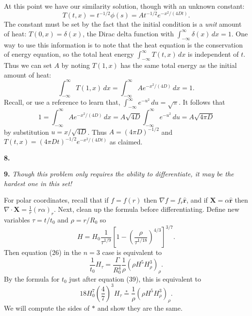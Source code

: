 \documentclass[10pt]{amsart}
\newcommand{\mfile}[1]{
\begin{quote}
\bigskip
\VerbatimInput[frame=single,label=\fbox{\normalsize \textsl{\,#1\,}},fontfamily=courier,fontsize=\footnotesize]{#1}
\end{quote}
}
\newcommand{\Div}{\nabla\cdot}
\newcommand{\grad}{\nabla}
\newcommand{\prob}[1]{\bigskip\noindent\large\textbf{#1.}\normalsize }
\begin{document}
At this point we have our similarity solution, though with an unknown constant:
    $$T(t,x) = t^{-1/2} \phi(s) = A t^{-1/2} e^{- x^2/(4Dt)}.$$
The constant must be set by the fact that the initial condition is a \emph{unit} amount of heat: $T(0,x) = \delta(x)$, the Dirac delta function with $\int_{-\infty}^\infty \delta(x)\,dx = 1$.  One way to use this information is to note that the heat equation is the conservation of energy equation, so the total heat energy $\int_{-\infty}^\infty T(t,x)\,dx$ is independent of $t$.  Thus we can set $A$ by noting $T(1,x)$ has the same total energy as the initial amount of heat:
    $$\int_{-\infty}^\infty T(1,x)\,dx = \int_{-\infty}^\infty A e^{- x^2/(4D)}\,dx = 1.$$
Recall, or use a reference to learn that, $\int_{-\infty}^\infty e^{- u^2}\,du = \sqrt{\pi}$.  It follows that
    $$1 = \int_{-\infty}^\infty A e^{- x^2/(4D)}\,dx = A \sqrt{4D} \int_{-\infty}^\infty e^{- u^2}\,du = A \sqrt{4\pi D}$$
by substitution $u=x/\sqrt{4D}$.  Thus $A = (4\pi D)^{-1/2}$ and $T(t,x) = (4\pi D t)^{-1/2} e^{- x^2/(4Dt)}$ as claimed.

\prob{8}

\mfile{verifyheat.m}


\prob{9}  \emph{Though this problem only requires the ability to differentiate, it may be the hardest one in this set!}

For polar coordinates, recall that if $f=f(r)$ then $\grad f = f_r \hat{\mathbf{r}}$, and if $\mathbf{X}=\alpha \hat{\mathbf{r}}$ then $\Div \mathbf{X} = \frac{1}{r} \left(r \alpha\right)_r$.  Next, clean up the formula before differentiating.  Define new variables $\tau = t/t_0$ and $\rho = r/R_0$ so
    $$H = H_0 \frac{1}{\tau^{1/9}} \left[1 - \left( \frac{\rho}{\tau^{1/18}} \right)^{4/3}\right]^{3/7}.$$
Then equation (26) in the $n=3$ case is equivalent to
    $$\frac{1}{t_0} H_\tau = \frac{\Gamma}{R_0^4} \frac{1}{\rho} \left(\rho H^5 H_\rho^3\right)_\rho.$$
By the formula for $t_0$ just after equation (39), this is equivalent to
    $$18 H_0^7 \left(\frac{4}{7}\right)^3 H_\tau \stackrel{\ast}{=} \frac{1}{\rho} \left(\rho H^5 H_\rho^3\right)_\rho.$$
We will compute the sides of $\ast$ and show they are the same.
\end{document}
